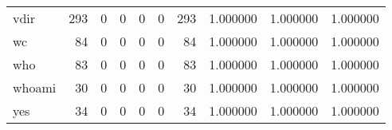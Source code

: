 \begin{tabular}{lrrrrrrrrr}
vdir      &                                       293 &                                                  0 &                                                  0 &                                                  0 &                                                  0 &                                                293 &                                           1.000000 &                               1.000000 &                             1.000000 \\
wc        &                                        84 &                                                  0 &                                                  0 &                                                  0 &                                                  0 &                                                 84 &                                           1.000000 &                               1.000000 &                             1.000000 \\
who       &                                        83 &                                                  0 &                                                  0 &                                                  0 &                                                  0 &                                                 83 &                                           1.000000 &                               1.000000 &                             1.000000 \\
whoami    &                                        30 &                                                  0 &                                                  0 &                                                  0 &                                                  0 &                                                 30 &                                           1.000000 &                               1.000000 &                             1.000000 \\
yes       &                                        34 &                                                  0 &                                                  0 &                                                  0 &                                                  0 &                                                 34 &                                           1.000000 &                               1.000000 &                             1.000000 \\
\bottomrule
\end{tabular}
